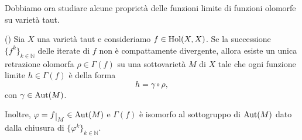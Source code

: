 Dobbiamo ora studiare alcune proprietà delle funzioni limite di funzioni olomorfe su varietà taut.

\begin{thm} \label{retraiii}
    (\cite[Theorem 2.1.29]{A1}) Sia $X$ una varietà taut e consideriamo $f\in\textnormal{Hol}(X,X)$. Se la successione $\{f^k\}_{k\in\mathbb{N}}$ delle iterate di $f$ non è compattamente divergente, allora esiste un unica retrazione olomorfa $\rho\in\Gamma(f)$ su una sottovarietà $M$ di $X$ tale che ogni funzione limite $h\in\Gamma(f)$ è della forma
    $$h=\gamma\circ\rho,$$
    con $\gamma\in\textnormal{Aut}(M)$.

    Inoltre, $\varphi=f\restrict{M}\in\textnormal{Aut}(M)$ e $\Gamma(f)$ è isomorfo al sottogruppo di $\textnormal{Aut}(M)$ dato dalla chiusura di $\{\varphi^k\}_{k \in\mathbb{N}}$.
\end{thm}

